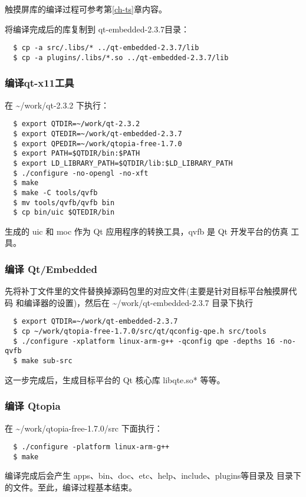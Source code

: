 触摸屏库的编译过程可参考第\ref{ch-ts}章内容。

将编译完成后的库复制到 qt-embedded-2.3.7目录：
\begin{verbatim}
  $ cp -a src/.libs/* ../qt-embedded-2.3.7/lib
  $ cp -a plugins/.libs/*.so ../qt-embedded-2.3.7/lib
\end{verbatim}

\subsubsection{编译qt-x11工具}
在 \textasciitilde/work/qt-2.3.2 下执行：
\begin{verbatim}
  $ export QTDIR=~/work/qt-2.3.2
  $ export QTEDIR=~/work/qt-embedded-2.3.7
  $ export QPEDIR=~/work/qtopia-free-1.7.0
  $ export PATH=$QTDIR/bin:$PATH
  $ export LD_LIBRARY_PATH=$QTDIR/lib:$LD_LIBRARY_PATH
  $ ./configure -no-opengl -no-xft
  $ make
  $ make -C tools/qvfb
  $ mv tools/qvfb/qvfb bin
  $ cp bin/uic $QTEDIR/bin
\end{verbatim}

生成的 uic 和 moc 作为 Qt 应用程序的转换工具，qvfb 是 Qt 开发平台的仿真
工具。

\subsubsection{编译 Qt/Embedded}
先将补丁文件里的文件替换掉源码包里的对应文件(主要是针对目标平台触摸屏代码
和编译器的设置)，然后在 \textasciitilde/work/qt-embedded-2.3.7 目录下执行

\begin{verbatim} 
  $ export QTDIR=~/work/qt-embedded-2.3.7
  $ cp ~/work/qtopia-free-1.7.0/src/qt/qconfig-qpe.h src/tools
  $ ./configure -xplatform linux-arm-g++ -qconfig qpe -depths 16 -no-qvfb
  $ make sub-src
\end{verbatim}

这一步完成后，生成目标平台的 Qt 核心库 libqte.so* 等等。

\subsubsection{编译 Qtopia}
在 \textasciitilde/work/qtopia-free-1.7.0/src 下面执行：
\begin{verbatim} 
  $ ./configure -platform linux-arm-g++
  $ make
\end{verbatim}

编译完成后会产生 apps、bin、doc、etc、help、include、plugins等目录及
目录下的文件。至此，编译过程基本结束。

